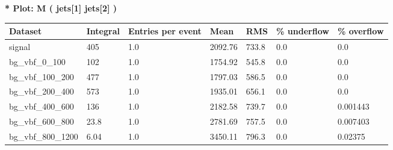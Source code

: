 \documentclass[a4paper, 10pt]{article}
\begin{document}
\textbf{* Plot: M ( jets[1] jets[2] ) }\\
   \begin{table}[H]
  \begin{center}
    \begin{tabular}{|m{23.0mm}|m{23.0mm}|m{18.0mm}|m{19.0mm}|m{19.0mm}|m{19.0mm}|m{19.0mm}|}
      \hline
      {\cellcolor{yellow}         Dataset}& {\cellcolor{yellow}         Integral}& {\cellcolor{yellow}         Entries per event}& {\cellcolor{yellow}         Mean}& {\cellcolor{yellow}         RMS}& {\cellcolor{yellow}         \% underflow}& {\cellcolor{yellow}         \% overflow}\\
      \hline
      {\cellcolor{white}         signal}& {\cellcolor{white}         405}& {\cellcolor{white}         1.0}& {\cellcolor{white}         2092.76}& {\cellcolor{white}         733.8}& {\cellcolor{green}         0.0}& {\cellcolor{green}         0.0}\\
      \hline
      {\cellcolor{white}         bg\_vbf\_0\_100}& {\cellcolor{white}         102}& {\cellcolor{white}         1.0}& {\cellcolor{white}         1754.92}& {\cellcolor{white}         545.8}& {\cellcolor{green}         0.0}& {\cellcolor{green}         0.0}\\
      \hline
      {\cellcolor{white}         bg\_vbf\_100\_200}& {\cellcolor{white}         477}& {\cellcolor{white}         1.0}& {\cellcolor{white}         1797.03}& {\cellcolor{white}         586.5}& {\cellcolor{green}         0.0}& {\cellcolor{green}         0.0}\\
      \hline
      {\cellcolor{white}         bg\_vbf\_200\_400}& {\cellcolor{white}         573}& {\cellcolor{white}         1.0}& {\cellcolor{white}         1935.01}& {\cellcolor{white}         656.1}& {\cellcolor{green}         0.0}& {\cellcolor{green}         0.0}\\
      \hline
      {\cellcolor{white}         bg\_vbf\_400\_600}& {\cellcolor{white}         136}& {\cellcolor{white}         1.0}& {\cellcolor{white}         2182.58}& {\cellcolor{white}         739.7}& {\cellcolor{green}         0.0}& {\cellcolor{green}         0.001443}\\
      \hline
      {\cellcolor{white}         bg\_vbf\_600\_800}& {\cellcolor{white}         23.8}& {\cellcolor{white}         1.0}& {\cellcolor{white}         2781.69}& {\cellcolor{white}         757.5}& {\cellcolor{green}         0.0}& {\cellcolor{green}         0.007403}\\
      \hline
      {\cellcolor{white}         bg\_vbf\_800\_1200}& {\cellcolor{white}         6.04}& {\cellcolor{white}         1.0}& {\cellcolor{white}         3450.11}& {\cellcolor{white}         796.3}& {\cellcolor{green}         0.0}& {\cellcolor{green}         0.02375}\\

\end{tabular}
\end{center}
\end{table}
\end{document}
